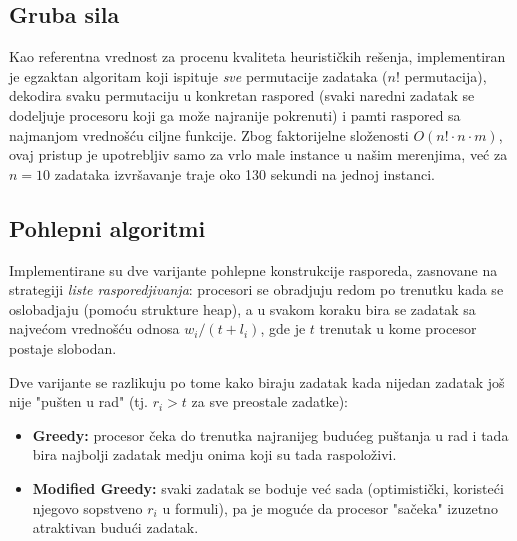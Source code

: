 \documentclass{article}
\begin{document}
\newpage
\subsection{Gruba sila}

Kao referentna vrednost za procenu kvaliteta heurističkih rešenja,
implementiran je egzaktan algoritam koji ispituje \emph{sve} permutacije
zadataka ($n!$ permutacija), dekodira svaku permutaciju u konkretan raspored
(svaki naredni zadatak se dodeljuje procesoru koji ga može najranije
pokrenuti) i pamti raspored sa najmanjom vrednošću ciljne funkcije. Zbog
faktorijelne složenosti $O(n! \cdot n \cdot m)$, ovaj pristup je upotrebljiv
samo za vrlo male instance u našim merenjima, već za $n=10$ zadataka
izvršavanje traje oko 130 sekundi na jednoj instanci.

\subsection{Pohlepni algoritmi}

Implementirane su dve varijante pohlepne konstrukcije rasporeda, zasnovane
na strategiji \textit{liste rasporedjivanja}: procesori se obradjuju redom po
trenutku kada se oslobadjaju (pomoću strukture heap), a u svakom koraku bira
se zadatak sa najvećom vrednošću odnosa $w_i / (t + l_i)$, gde je $t$ trenutak
u kome procesor postaje slobodan.

Dve varijante se razlikuju po tome kako biraju zadatak kada nijedan zadatak
još nije "pušten u rad" (tj. $r_i > t$ za sve preostale zadatke):
\begin{itemize}
    \item \textbf{Greedy:} procesor čeka do trenutka najranijeg budućeg
        puštanja u rad i tada bira najbolji zadatak medju onima koji su tada
        raspoloživi.
    \item \textbf{Modified Greedy:} svaki zadatak se boduje već sada
        (optimistički, koristeći njegovo sopstveno $r_i$ u formuli), pa je
        moguće da procesor "sačeka" izuzetno atraktivan budući zadatak.
\end{itemize}

\end{document}

